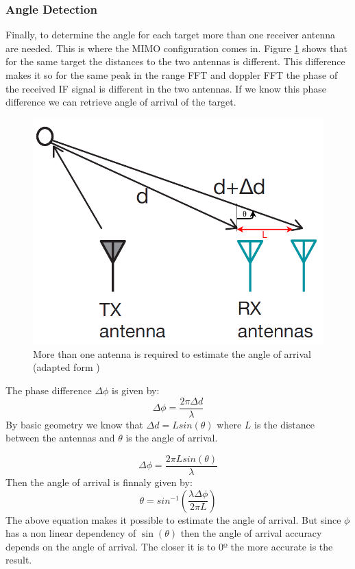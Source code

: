 \subsubsection{Angle Detection}
Finally, to determine the angle for each target more than one receiver antenna are needed. This is where the \ac{MIMO} configuration comes in. Figure \ref{fig:angle} shows that for the same target the distances to the two antennas is different.  This difference makes it so for the same peak in the range \ac{FFT} and doppler \ac{FFT} the phase of the received \ac{IF} signal is different in the two antennas. If we know this phase difference we can retrieve angle of arrival of the target. 
\begin{figure}[ht] 
\centerline{\includegraphics [width=0.5 \textwidth]{imgs/chapter2/angle2.png}}
\caption[Angle of arrival estimation using more than one antenna]{More than one antenna is required to estimate the angle of arrival (adapted form \cite{iovescu2017fundamentals})}
\label{fig:angle}
\end{figure}
The phase difference $\Delta \phi$ is given by:
\begin{equation}
    \Delta \phi=\frac{2 \pi \Delta d}{\lambda}
\end{equation}
By basic geometry we know that $\Delta d =L sin(\theta)$ where $L$ is the distance between the antennas and $\theta$ is the angle of arrival. 

\begin{equation}
    \Delta \phi=\frac{2 \pi L sin(\theta)}{\lambda}
\end{equation}
Then the angle of arrival is finnaly given by:
\begin{equation}
    \theta = sin^{-1}(\frac{\lambda \Delta \phi}{2 \pi L})
\end{equation}
The above equation makes it possible to estimate the angle of arrival. But since $\phi$ has a non linear dependency of $\sin(\theta)$ then the angle of arrival accuracy depends on the angle of arrival. The closer it is to 0º the more accurate is the result.

